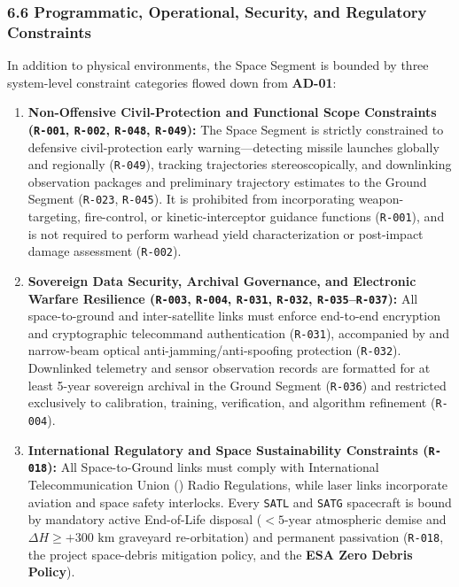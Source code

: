 \subsubsection{6.6 Programmatic, Operational, Security, and Regulatory Constraints}

In addition to physical environments, the  Space Segment is bounded by three system-level constraint categories flowed down from \textbf{AD-01}:
\begin{enumerate}
    \item \textbf{Non-Offensive Civil-Protection and Functional Scope Constraints (\texttt{R-001}, \texttt{R-002}, \texttt{R-048}, \texttt{R-049}):} The Space Segment is strictly constrained to defensive civil-protection early warning---detecting missile launches globally and regionally (\texttt{R-049}), tracking trajectories stereoscopically, and downlinking observation packages and preliminary trajectory estimates to the Ground Segment (\texttt{R-023}, \texttt{R-045}). It is prohibited from incorporating weapon-targeting, fire-control, or kinetic-interceptor guidance functions (\texttt{R-001}), and is not required to perform warhead yield characterization or post-impact damage assessment (\texttt{R-002}).
    \item \textbf{Sovereign Data Security, Archival Governance, and Electronic Warfare Resilience (\texttt{R-003}, \texttt{R-004}, \texttt{R-031}, \texttt{R-032}, \texttt{R-035}--\texttt{R-037}):} All space-to-ground and inter-satellite links must enforce end-to-end encryption and cryptographic telecommand authentication (\texttt{R-031}), accompanied by  and narrow-beam optical anti-jamming/anti-spoofing protection (\texttt{R-032}). Downlinked telemetry and sensor observation records are formatted for at least 5-year sovereign archival in the Ground Segment (\texttt{R-036}) and restricted exclusively to calibration, training, verification, and algorithm refinement (\texttt{R-004}).
    \item \textbf{International Regulatory and Space Sustainability Constraints (\texttt{R-018}):} All Space-to-Ground  links must comply with International Telecommunication Union () Radio Regulations, while laser  links incorporate aviation and space safety interlocks. Every \texttt{SATL} and \texttt{SATG} spacecraft is bound by mandatory active End-of-Life disposal ($< 5\text{-year}$  atmospheric demise and $\Delta H \ge +300\text{ km}$  graveyard re-orbitation) and permanent passivation (\texttt{R-018}, the project space-debris mitigation policy, and the \textbf{ESA Zero Debris Policy}).
\end{enumerate}

